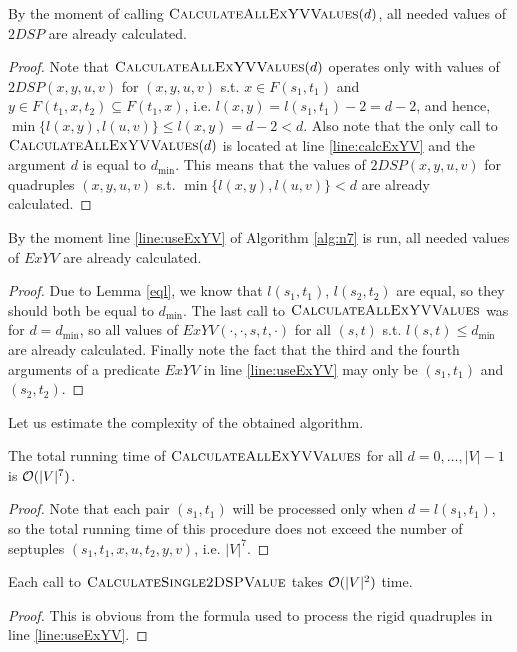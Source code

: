 \begin{proposition} \label{n7_corr1}
By the moment of calling $\textsc{CalculateAllExYVValues}(d)$, all needed values of $2DSP$ are already calculated.
\end{proposition}
\begin{proof}
Note that $\textsc{CalculateAllExYVValues}(d)$ operates only with values of $2DSP(x, y, u, v)$ for $(x, y, u, v)$ s.t. $x \in F(s_1, t_1)$ and $y \in F(t_1,x,t_2) \subseteq F(t_1, x)$, i.e. $l(x, y) = l(s_1, t_1) - 2 = d - 2$, and hence, $\min\{l(x, y), l(u, v)\} \leq l(x, y) = d - 2 < d$. Also note that the only call to $\textsc{CalculateAllExYVValues}(d)$ is located at line \ref{line:calcExYV} and the argument $d$ is equal to $d_{\min}$. This means that the values of $2DSP(x, y, u, v)$ for quadruples $(x, y, u, v)$ s.t. $\min\{l(x, y), l(u, v)\} < d$ are already calculated. 
\end{proof}

\begin{proposition} \label{n7_corr2}
By the moment line \ref{line:useExYV} of Algorithm \ref{alg:n7} is run, all needed values of $ExYV$ are already calculated.
\end{proposition}
\begin{proof}
Due to Lemma \ref{eql}, we know that $l(s_1, t_1)$, $l(s_2, t_2)$ are equal, so they should both be equal to $d_{\min}$. The last call to $\textsc{CalculateAllExYVValues}$ was for $d = d_{\min}$, so all values of $ExYV(\cdot, \cdot, s, t, \cdot)$ for all $(s, t)$ s.t. $l(s, t) \leq d_{\min}$ are already calculated. Finally note the fact that the third and the fourth arguments of a predicate $ExYV$ in line \ref{line:useExYV} may only be $(s_1, t_1)$ and $(s_2, t_2)$.
\end{proof}

Let us estimate the complexity of the obtained algorithm.

\begin{proposition} \label{n7_rt1}
The total running time of $\textsc{CalculateAllExYVValues}$ for all $d = 0, \ldots, |V|-1$ is $\mathcal{O}(|V|^7)$. 
\end{proposition}
\begin{proof}
Note that each pair $(s_1, t_1)$ will be processed only when $d = l(s_1, t_1)$, so the total running time of this procedure does not exceed the number of septuples $(s_1, t_1, x, u, t_2, y, v)$, i.e. $|V|^7$.
\end{proof}

\begin{proposition} \label{n7_rt2}
Each call to $\textsc{CalculateSingle2DSPValue}$ takes $\mathcal{O}(|V|^2)$ time.
\end{proposition}
\begin{proof}
This is obvious from the formula used to process the rigid quadruples in line \ref{line:useExYV}.
\end{proof}

